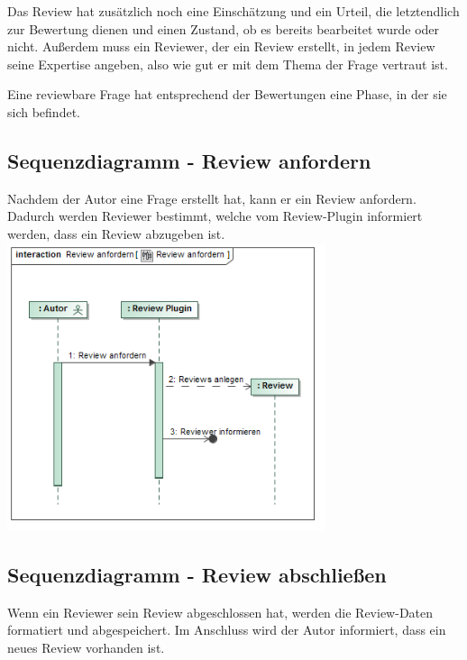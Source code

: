 \documentclass[a4paper]{scrreprt}
\begin{document}
Das Review hat zusätzlich noch eine Einschätzung und ein Urteil, die letztendlich zur Bewertung dienen und einen Zustand, ob es bereits bearbeitet wurde oder nicht. 
Außerdem muss ein Reviewer, der ein Review erstellt, in jedem Review seine Expertise angeben, also wie gut er mit dem Thema der Frage vertraut ist.

Eine reviewbare Frage hat entsprechend der Bewertungen eine Phase, in der sie sich befindet. 

\subsection{Sequenzdiagramm - Review anfordern}

Nachdem der Autor eine Frage erstellt hat, kann er ein Review anfordern. Dadurch werden Reviewer bestimmt, welche vom Review-Plugin informiert werden, dass ein Review abzugeben ist.\\

\includegraphics[width=0.7\textwidth]{Sequence_Diagram__Review_anfordern__Review_anfordern.png}
\label{Review anfordern}

\newpage

\subsection{Sequenzdiagramm - Review abschließen}

Wenn ein Reviewer sein Review abgeschlossen hat, werden die Review-Daten formatiert und abgespeichert. Im Anschluss wird der Autor informiert, dass ein neues Review vorhanden ist.\\
\end{document}
